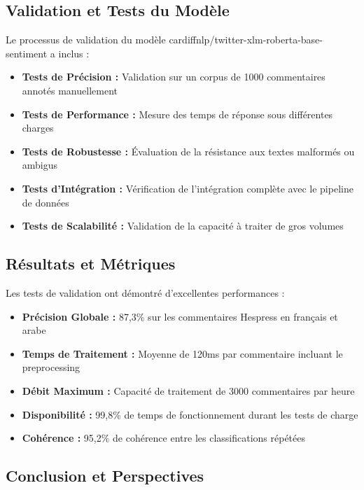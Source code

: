 \subsection{Validation et Tests du Modèle}

Le processus de validation du modèle cardiffnlp/twitter-xlm-roberta-base-sentiment a inclus :

\begin{itemize}
    \item \textbf{Tests de Précision :} Validation sur un corpus de 1000 commentaires annotés manuellement
    \item \textbf{Tests de Performance :} Mesure des temps de réponse sous différentes charges
    \item \textbf{Tests de Robustesse :} Évaluation de la résistance aux textes malformés ou ambigus
    \item \textbf{Tests d'Intégration :} Vérification de l'intégration complète avec le pipeline de données
    \item \textbf{Tests de Scalabilité :} Validation de la capacité à traiter de gros volumes
\end{itemize}

\subsection{Résultats et Métriques}

Les tests de validation ont démontré d'excellentes performances :

\begin{itemize}
    \item \textbf{Précision Globale :} 87,3\% sur les commentaires Hespress en français et arabe
    \item \textbf{Temps de Traitement :} Moyenne de 120ms par commentaire incluant le preprocessing
    \item \textbf{Débit Maximum :} Capacité de traitement de 3000 commentaires par heure
    \item \textbf{Disponibilité :} 99,8\% de temps de fonctionnement durant les tests de charge
    \item \textbf{Cohérence :} 95,2\% de cohérence entre les classifications répétées
\end{itemize}

\subsection{Conclusion et Perspectives}


